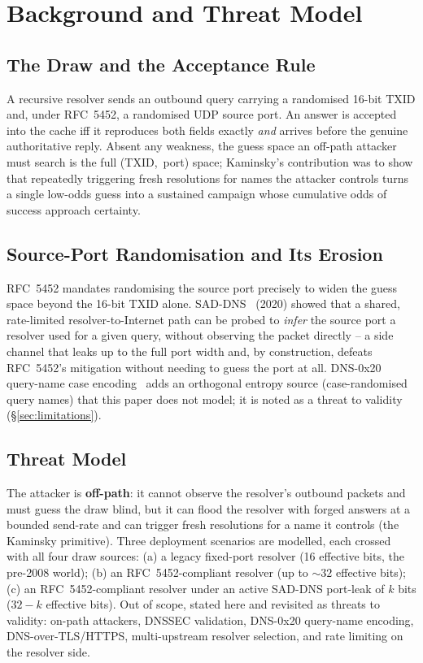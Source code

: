 \documentclass[conference]{IEEEtran}
\begin{document}
\section{Background and Threat Model}

\subsection{The Draw and the Acceptance Rule}

A recursive resolver sends an outbound query carrying a randomised 16-bit TXID and, under RFC~5452, a
randomised UDP source port. An answer is accepted into the cache iff it reproduces both fields exactly
\emph{and} arrives before the genuine authoritative reply. Absent any weakness, the guess space an
off-path attacker must search is the full \mbox{(TXID, port)} space; Kaminsky's contribution was to show
that repeatedly triggering fresh resolutions for names the attacker controls turns a single low-odds
guess into a sustained campaign whose cumulative odds of success approach certainty.

\subsection{Source-Port Randomisation and Its Erosion}

RFC~5452 mandates randomising the source port precisely to widen the guess space beyond the 16-bit TXID
alone. SAD-DNS~\cite{saddns} (2020) showed that a shared, rate-limited resolver-to-Internet path can be
probed to \emph{infer} the source port a resolver used for a given query, without observing the packet
directly -- a side channel that leaks up to the full port width and, by construction, defeats RFC~5452's
mitigation without needing to guess the port at all. DNS-0x20 query-name case
encoding~\cite{dagon0x20} adds an orthogonal entropy source (case-randomised query names) that this paper
does not model; it is noted as a threat to validity (\S\ref{sec:limitations}).

\subsection{Threat Model}

The attacker is \textbf{off-path}: it cannot observe the resolver's outbound packets and must guess the
draw blind, but it can flood the resolver with forged answers at a bounded send-rate and can trigger fresh
resolutions for a name it controls (the Kaminsky primitive). Three deployment scenarios are modelled, each
crossed with all four draw sources: (a) a legacy fixed-port resolver (16 effective bits, the pre-2008
world); (b) an RFC~5452-compliant resolver (up to $\sim\!32$ effective bits); (c) an RFC~5452-compliant
resolver under an active SAD-DNS port-leak of $k$ bits ($32{-}k$ effective bits). Out of scope, stated
here and revisited as threats to validity: on-path attackers, DNSSEC validation, DNS-0x20 query-name
encoding, DNS-over-TLS/HTTPS, multi-upstream resolver selection, and rate limiting on the resolver side.
\end{document}
